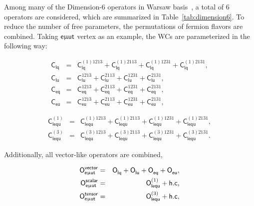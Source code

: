 Among many of the Dimension-6 operators in Warsaw basis~\cite{Grzadkowski:2010es,Aguilar-Saavedra:2018ksv}, a total of 6 operators are considered, which are summarized in Table~\ref{tab:dimension6}. To reduce the number of free parameters, the permutations of fermion flavors are combined. Taking $\textsf{e}\upmu\textsf{{u}t}$ vertex as an example, the \acp{WC} are parameterized in the following way:

\begin{eqnarray}
\label{eq:1:0}
 \textsf{C}_{\textsf{lq}}
 &=& \textsf{C}_{\textsf{lq}}^{(1)1213}
 + \textsf{C}_{\textsf{lq}}^{(1)2113}
 + \textsf{C}_{\textsf{lq}}^{(1)1231}
 + \textsf{C}_{\textsf{lq}}^{(1)2131}
 ,\\
\label{eq1:1}
 \textsf{C}_{\textsf{lu}}  
 &=& \textsf{C}_{\textsf{lu}}^{1213}
 + \textsf{C}_{\textsf{lu}}^{2113}
 + \textsf{C}_{\textsf{lu}}^{1231}
 + \textsf{C}_{\textsf{lu}}^{2131}
 ,\\
 \label{eq:1:2}
 \textsf{C}_{\textsf{eq}}
 &=& \textsf{C}_{\textsf{eq}}^{1213}
 + \textsf{C}_{\textsf{eq}}^{2113}
 + \textsf{C}_{\textsf{eq}}^{1231}
 + \textsf{C}_{\textsf{eq}}^{2131}
 ,\\
 \label{eq:1:3}
 \textsf{C}_{\textsf{eu}}  
 &=& \textsf{C}_{\textsf{eu}}^{1213}
 + \textsf{C}_{\textsf{eu}}^{2113}
 + \textsf{C}_{\textsf{eu}}^{1231}
 + \textsf{C}_{\textsf{eu}}^{2131},
\end{eqnarray}

\begin{eqnarray}
\label{eq:1:4}
 \textsf{C}_{\textsf{lequ}}^{(1)}  
 &=& \textsf{C}_{\textsf{lequ}}^{(1)1213}
 + \textsf{C}_{\textsf{lequ}}^{(1)2113}
 + \textsf{C}_{\textsf{lequ}}^{(1)1231}
 + \textsf{C}_{\textsf{lequ}}^{(1)2131}
 ,\\
\label{eq:1:5}
 \textsf{C}_{\textsf{lequ}}^{(3)}
 &=& \textsf{C}_{\textsf{lequ}}^{(3)1213}
 + \textsf{C}_{\textsf{lequ}}^{(3)2113}
 + \textsf{C}_{\textsf{lequ}}^{(3)1231}
 + \textsf{C}_{\textsf{lequ}}^{(3)2131}. 
\end{eqnarray}

Additionally, all vector-like operators are combined,

\begin{eqnarray}
\label{eq:1:6}
 \textsf{O}^{\textsf{vector}}_{\textsf{e}\upmu\textsf{{u}t}}&=&\textsf{O}^{}_{\textsf{lq}}+\textsf{O}^{}_{\textsf{lu}}+\textsf{O}^{}_{\textsf{eq}}+\textsf{O}^{}_{\textsf{eu}},\\
\label{eq:1:7}
 \textsf{O}^{\textsf{scalar}}_{\textsf{e}\upmu\textsf{{u}t}}&=&\textsf{O}^{(1)}_{\textsf{lequ}}+\textsf{h.c},\\
\label{eq:1:8}
 \textsf{O}^{\textsf{tensor}}_{\textsf{e}\upmu\textsf{{u}t}}&=&\textsf{O}^{(3)}_{\textsf{lequ}}+\textsf{h.c},
\end{eqnarray}

